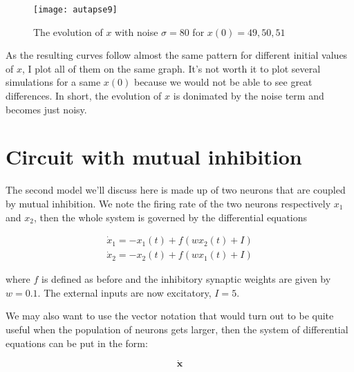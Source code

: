 \vspace{-1em}
\begin{figure}[H]
  \centering
  \texttt{[image: autapse9]}
  \caption
    {The evolution of $x$ with noise $\sigma = 80$ for $x(0) = 49, 50, 51$}
\end{figure}

As the resulting curves follow almost the same pattern for different 
initial values of $x$, I plot all of them on the same graph. It's not worth
it to plot several simulations for a same $x(0)$ because we would not be able
to see great differences. In short, the evolution of $x$ is donimated by
the noise term and becomes just noisy.

\section{Circuit with mutual inhibition}

The second model we'll discuss here is made up of two neurons that are coupled
by mutual inhibition. We note the firing rate of the two neurons respectively
$x_1$ and $x_2$, then the whole system is governed by the differential
equations

\begin{gather*}
  \dot{x}_1 = -x_1(t) + f(wx_2(t) + I)\\
  \dot{x}_2 = -x_2(t) + f(wx_1(t) + I)
\end{gather*}

\noindent
where $f$ is defined as before and the inhibitory synaptic weights are given
by $w = 0.1$. The external inputs are now excitatory, $I = 5$.

We may also want to use the vector notation that would turn out to be quite
useful when the population of neurons gets larger, then the system of
differential equations can be put in the form:

\[\dot{\mathbf{x}}\]
